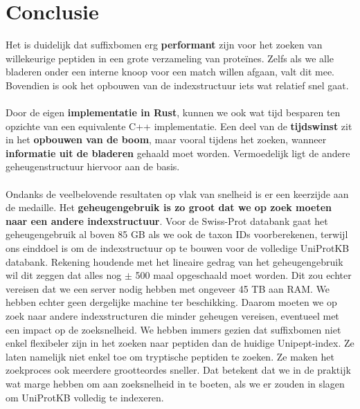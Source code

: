 \section{Conclusie}\label{sec:conclusie-suffix-bomen}
Het is duidelijk dat suffixbomen erg \textbf{performant} zijn voor het zoeken van willekeurige peptiden in een grote verzameling van proteïnes.
Zelfs als we alle bladeren onder een interne knoop voor een match willen afgaan, valt dit mee.
Bovendien is ook het opbouwen van de indexstructuur iets wat relatief snel gaat.
\\ \\
Door de eigen \textbf{implementatie in Rust}, kunnen we ook wat tijd besparen ten opzichte van een equivalente C++ implementatie.
Een deel van de \textbf{tijdswinst} zit in het\textbf{ opbouwen van de boom}, maar vooral tijdens het zoeken, wanneer \textbf{informatie uit de bladeren} gehaald moet worden.
Vermoedelijk ligt de andere geheugenstructuur hiervoor aan de basis.
\\ \\
Ondanks de veelbelovende resultaten op vlak van snelheid is er een keerzijde aan de medaille.
Het \textbf{geheugengebruik is zo groot dat we op zoek moeten naar een andere indexstructuur}.
Voor de Swiss-Prot databank gaat het geheugengebruik al boven 85 GB als we ook de taxon IDs voorberekenen, terwijl ons einddoel is om de indexstructuur op te bouwen voor de volledige UniProtKB databank.
Rekening houdende met het lineaire gedrag van het geheugengebruik wil dit zeggen dat alles nog $\pm$ 500 maal opgeschaald moet worden.
Dit zou echter vereisen dat we een server nodig hebben met ongeveer 45 TB aan RAM\@.
We hebben echter geen dergelijke machine ter beschikking.
Daarom moeten we op zoek naar andere indexstructuren die minder geheugen vereisen, eventueel met een impact op de zoeksnelheid.
We hebben immers gezien dat suffixbomen niet enkel flexibeler zijn in het zoeken naar peptiden dan de huidige Unipept-index.
Ze laten namelijk niet enkel toe om tryptische peptiden te zoeken.
Ze maken het zoekproces ook meerdere grootteordes sneller.
Dat betekent dat we in de praktijk wat marge hebben om aan zoeksnelheid in te boeten, als we er zouden in slagen om UniProtKB volledig te indexeren.
